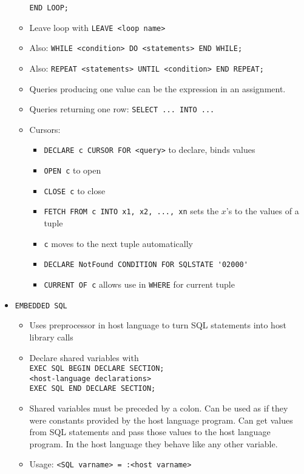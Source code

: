 \documentclass[landscape,8pt]{extarticle}
\newcommand{\code}{\lstinline}
\begin{document}
\begin{multicols}{4}
\begin{itemize}
\begin{itemize}
\code{END LOOP;}
        \item Leave loop with \code{LEAVE <loop name>}
        \item Also: \code{WHILE <condition> DO <statements> END WHILE;}
        \item Also: \code{REPEAT <statements> UNTIL <condition> END REPEAT;}
        \item Queries producing one value can be the expression in an assignment.
        \item Queries returning one row: \code{SELECT ... INTO ...}
        \item Cursors:
        \begin{itemize}
            \item \code{DECLARE c CURSOR FOR <query>} to declare, binds values
            \item \code{OPEN c} to open
            \item \code{CLOSE c} to close
            \item \code{FETCH FROM c INTO x1, x2, ..., xn} sets the $x$'s to the values of a tuple
            \item \code{c} moves to the next tuple automatically
            \item \code{DECLARE NotFound CONDITION FOR SQLSTATE '02000'}
            \item \code{CURRENT OF c} allows use in \code{WHERE} for current tuple
        \end{itemize}
    \end{itemize}
    \item \code{EMBEDDED SQL}
    \begin{itemize}
        \item Uses preprocessor in host language to turn SQL statements into host library calls
        \item Declare shared variables with \\
\code{EXEC SQL BEGIN DECLARE SECTION;}\\
\code{<host-language declarations>}\\
\code{EXEC SQL END DECLARE SECTION;}
        \item Shared variables must be preceded by a colon. Can be used as if they were constants
        provided by the host language program. Can get values from SQL statements and pass those
        values to the host language program. In the host language they behave like any other
        variable.
        \item Usage: \code{<SQL varname> = :<host varname>}

\end{itemize}
\end{itemize}
\end{multicols}
\end{document}
